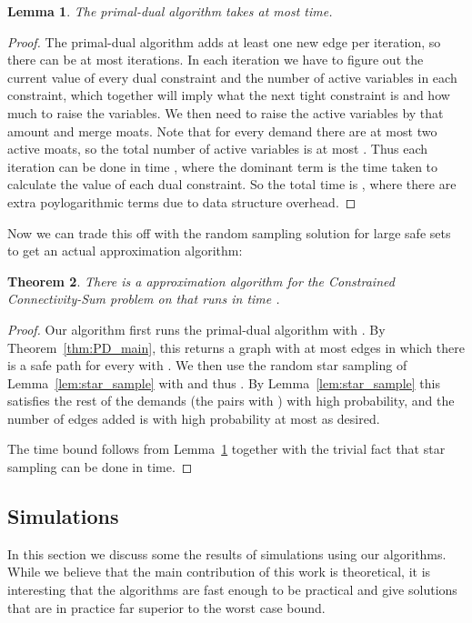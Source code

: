 \documentclass[11pt,letterpaper]{article}
\newtheorem{theorem}{Theorem}[section]
\newtheorem{lemma}[theorem]{Lemma}
\theoremstyle{definition}
\begin{document}
\begin{lemma} \label{lem:PD_time}
The primal-dual algorithm takes at most  time.
\end{lemma}
\begin{proof}
The primal-dual algorithm adds at least one new edge per iteration, so there can be at most  iterations.  In each iteration we have to figure out the current value of every dual constraint and the number of active variables in each constraint, which together will imply what the next tight constraint is and how much to raise the  variables.  We then need to raise the active variables by that amount and merge moats.  Note that for every demand there are at most two active moats, so the total number of active variables is at most .  Thus each iteration can be done in time , where the dominant term is the time taken to calculate the value of each dual constraint.  So the total time is , where there are extra poylogarithmic terms due to data structure overhead.
\end{proof}


Now we can trade this off with the random sampling solution for large
safe sets to get an actual approximation algorithm:

\begin{theorem} \label{thm:PD_total}
  There is a  approximation algorithm for the
  {\sc Constrained Connectivity-Sum} problem on  that runs in time .
\end{theorem}
\begin{proof}
Our algorithm first runs the primal-dual algorithm with .  By Theorem~\ref{thm:PD_main}, this returns a graph  with at most  edges in which there is a safe path for every  with .  We then use the random star sampling of Lemma~\ref{lem:star_sample} with  and thus .  By Lemma~\ref{lem:star_sample} this satisfies the rest of the demands (the pairs  with ) with high probability, and the number of edges added is with high probability at most  as desired.

The time bound follows from Lemma~\ref{lem:PD_time} together with the trivial fact that star sampling can be done in  time.
\end{proof}


\subsection{Simulations} \label{sec:Simulations}

In this section we discuss some the results of simulations using our
algorithms.  While we believe that the main contribution of this work
is theoretical, it is interesting that the algorithms are fast enough
to be practical and give solutions that are in practice far superior
to the worst case  bound.
\end{document}

